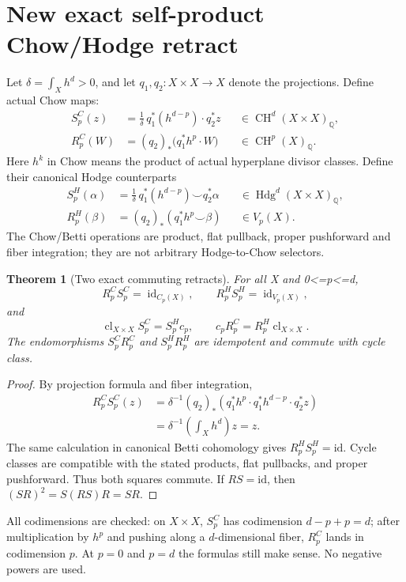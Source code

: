 \documentclass[11pt,a4paper]{article}
\newtheorem{theorem}{Theorem}[section]
\newcommand{\Q}{\mathbb Q}
\newcommand{\CH}{\operatorname{CH}}
\newcommand{\Hdg}{\operatorname{Hdg}}
\newcommand{\cl}{\operatorname{cl}}
\newcommand{\id}{\operatorname{id}}
\begin{document}
\section{New exact self-product Chow/Hodge retract}
Let \(\delta=\int_X h^d>0\), and let \(q_1,q_2:X\times X\to X\)
denote the projections.  Define actual Chow maps:
\begin{align}
 S^C_p(z)&=\frac1\delta\,q_1^*(h^{d-p})\cdot q_2^*z
    &&\in\CH^d(X\times X)_\Q, \tag{3.1}\\
 R^C_p(W)&=(q_2)_*\bigl(q_1^*h^p\cdot W\bigr)
    &&\in\CH^p(X)_\Q. \tag{3.2}
\end{align}
Here \(h^k\) in Chow means the product of actual hyperplane
divisor classes.  Define their canonical Hodge counterparts
\begin{align}
 S^H_p(\alpha)&=\frac1\delta\,q_1^*(h^{d-p})
      \smile q_2^*\alpha &&\in\Hdg^d(X\times X)_\Q,
      \tag{3.3}\\
 R^H_p(\beta)&=(q_2)_*(q_1^*h^p\smile\beta)
      &&\in V_p(X). \tag{3.4}
\end{align}
The Chow/Betti operations are product, flat pullback,
proper pushforward and fiber integration; they are not
arbitrary Hodge-to-Chow selectors.

\begin{theorem}[Two exact commuting retracts]\label{th:retract}
For all X and 0<=p<=d,
\[
 R^C_pS^C_p=\id_{C_p(X)},\qquad
 R^H_pS^H_p=\id_{V_p(X)}, \tag{3.5}
\]
and
\[
 \cl_{X\times X}S^C_p=S^H_pc_p,\qquad
 c_pR^C_p=R^H_p\cl_{X\times X}. \tag{3.6}
\]
The endomorphisms \(S^C_pR^C_p\) and \(S^H_pR^H_p\) are
idempotent and commute with cycle class.
\end{theorem}
\begin{proof}
By projection formula and fiber integration,
\begin{align*}
 R^C_pS^C_p(z)
 &=\delta^{-1}(q_2)_*
   (q_1^*h^p\cdot q_1^*h^{d-p}\cdot q_2^*z)\\
 &=\delta^{-1}\left(\int_X h^d\right)z=z.
\end{align*}
The same calculation in canonical Betti cohomology gives
\(R^H_pS^H_p=\mathrm{id}\).  Cycle classes are compatible with
the stated products, flat pullbacks, and proper pushforward.
Thus both squares commute.  If \(RS=\mathrm{id}\), then
\((SR)^2=S(RS)R=SR\).
\end{proof}
All codimensions are checked: on \(X\times X\), \(S^C_p\) has
codimension \(d-p+p=d\); after multiplication by \(h^p\)
and pushing along a \(d\)-dimensional fiber, \(R^C_p\) lands
in codimension \(p\).  At \(p=0\) and \(p=d\) the formulas still
make sense.  No negative powers are used.
\end{document}
